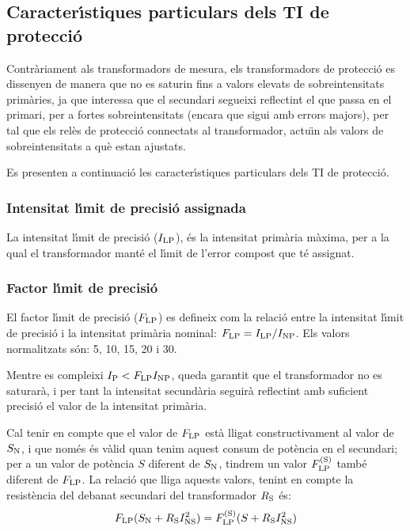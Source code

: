 \subsection{Caracter\'{\i}stiques particulars dels TI de protecci\'{o}}

Contr\`{a}riament als transformadors de mesura, els transformadors de
protecci\'{o} es dissenyen de manera que no es saturin fins a  valors
elevats de sobreintensitats prim\`{a}ries, ja que interessa que el
secundari segueixi reflectint el que passa en el primari, per a
fortes sobreintensitats (encara que sigui amb errors majors), per
tal que els rel\`{e}s de protecci\'{o} connectats al transformador, actu\"{\i}n
als valors de sobreintensitats a qu\`{e} estan ajustats.

Es presenten a continuaci\'{o} les caracter\'{\i}stiques particulars dels TI
de protecci\'{o}.

\subsubsection{Intensitat l\'{\i}mit de precisi\'{o} assignada}

 La intensitat
l\'{\i}mit de precisi\'{o} ($I_\mathrm{LP}$),
\'{e}s la intensitat prim\`{a}ria m\`{a}xima, per a la qual el transformador mant\'{e} el l\'{\i}mit
de l'error compost que t\'{e} assignat.

\subsubsection{Factor l\'{\i}mit de precisi\'{o}}

 El factor l\'{\i}mit de precisi\'{o}
($F_\mathrm{LP}$) es defineix com la relaci\'{o} entre la intensitat l\'{\i}mit de precisi\'{o}
i la intensitat prim\`{a}ria nominal: $F_\mathrm{LP} = I_\mathrm{LP} /I_\mathrm{NP}$.
Els valors normalitzats s\'{o}n: 5, 10, 15, 20 i 30.

Mentre es compleixi  $I_\mathrm{P}<F_\mathrm{LP} I_\mathrm{NP}$, queda garantit
que el transformador no es saturar\`{a}, i per tant la intensitat
secund\`{a}ria seguir\`{a} reflectint amb suficient precisi\'{o} el valor de la
intensitat prim\`{a}ria.

Cal tenir en compte que el valor de $F_\mathrm{LP}$ est\`{a} lligat
constructivament al valor de $S_\mathrm{N}$, i que nom\'{e}s \'{e}s v\`{a}lid quan
tenim aquest consum de  pot\`{e}ncia en el secundari; per a un valor de
pot\`{e}ncia $S$ diferent de $S_\mathrm{N}$, tindrem un valor
$F_\mathrm{LP}^\mathrm{(S)}$ tamb\'{e} diferent de  $F_\mathrm{LP}$. La relaci\'{o} que
lliga aquests valors, tenint en compte la resist\`{e}ncia del debanat
secundari del transformador  $R_\mathrm{S}$ \'{e}s:
\begin{equation}\label{eq:flp}
    F_\mathrm{LP} (S_\mathrm{N}+R_\mathrm{S}I_\mathrm{NS}^2) =
    F_\mathrm{LP}^\mathrm{(S)} (S+R_\mathrm{S}I_\mathrm{NS}^2)
\end{equation}

